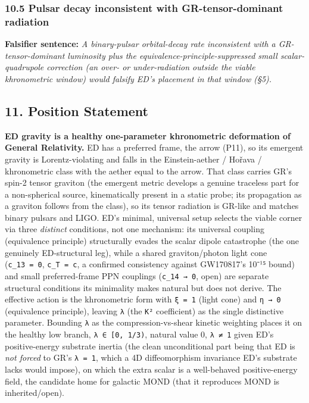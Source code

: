 \documentclass[
]{article}
\begin{document}
\subsubsection{10.5 Pulsar decay inconsistent with GR-tensor-dominant
radiation}\label{pulsar-decay-inconsistent-with-gr-tensor-dominant-radiation}

\textbf{Falsifier sentence:} \emph{A binary-pulsar orbital-decay rate
inconsistent with a GR-tensor-dominant luminosity plus the
equivalence-principle-suppressed small scalar-quadrupole correction (an
over- or under-radiation outside the viable khronometric window) would
falsify ED's placement in that window (§5).}

\subsection{11. Position Statement}\label{position-statement}

\textbf{ED gravity is a healthy one-parameter khronometric deformation
of General Relativity.} ED has a preferred frame, the arrow (P11), so
its emergent gravity is Lorentz-violating and falls in the
Einstein-aether / Hořava / khronometric class with the aether equal to
the arrow. That class carries GR's spin-2 tensor graviton (the emergent
metric develops a genuine traceless part for a non-spherical source,
kinematically present in a static probe; its propagation as a graviton
follows from the class), so its tensor radiation is GR-like and matches
binary pulsars and LIGO. ED's minimal, universal setup selects the
viable corner via three \emph{distinct} conditions, not one mechanism:
its universal coupling (equivalence principle) structurally evades the
scalar dipole catastrophe (the one genuinely ED-structural leg), while a
shared graviton/photon light cone (\texttt{c\_13\ =\ 0},
\texttt{c\_T\ =\ c}, a confirmed consistency against GW170817's 10⁻¹⁵
bound) and small preferred-frame PPN couplings (\texttt{c\_14\ →\ 0},
open) are separate structural conditions its minimality makes natural
but does not derive. The effective action is the khronometric form with
\texttt{ξ\ =\ 1} (light cone) and \texttt{η\ →\ 0} (equivalence
principle), leaving \texttt{λ} (the \texttt{K²} coefficient) as the
single distinctive parameter. Bounding \texttt{λ} as the
compression-vs-shear kinetic weighting places it on the healthy low
branch, \texttt{λ\ ∈\ {[}0,\ 1/3)}, natural value 0, \texttt{λ\ ≠\ 1}
given ED's positive-energy substrate inertia (the clean unconditional
part being that ED is \emph{not forced} to GR's \texttt{λ\ =\ 1}, which
a 4D diffeomorphism invariance ED's substrate lacks would impose), on
which the extra scalar is a well-behaved positive-energy field, the
candidate home for galactic MOND (that it reproduces MOND is
inherited/open).
\end{document}
